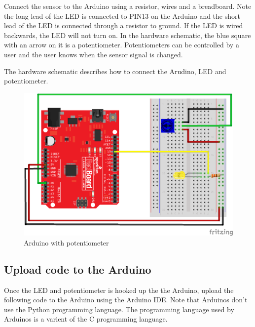 \documentclass{book}
\makeatletter
\def\maxwidth{\ifdim\Gin@nat@width>\linewidth\linewidth
    \else\Gin@nat@width\fi}
\let\Oldincludegraphics\includegraphics
\renewcommand{\includegraphics}[1]{\Oldincludegraphics[width=.8\maxwidth]{#1}}
\makeatother
\begin{document}
    
        Connect the sensor to the Arduino using a resistor, wires and a
breadboard. Note the long lead of the LED is connected to PIN13 on the
Arduino and the short lead of the LED is connected through a resistor to
ground. If the LED is wired backwards, the LED will not turn on. In the
hardware schematic, the blue square with an arrow on it is a
potentiometer. Potentiometers can be controlled by a user and the user
knows when the sensor signal is changed.

The hardware schematic describes how to connect the Arudino, LED and
potentiometer.
    




    
        \begin{figure}
\centering
\includegraphics{images/redboard_pot_led_fritzing.png}
\caption{Arduino with potentiometer}
\end{figure}
    




    
        \subsection{Upload code to the
Arduino}\label{upload-code-to-the-arduino}
    




    
        Once the LED and potentiometer is hooked up the the Arduino, upload the
following code to the Arduino using the Arduino IDE. Note that Arduinos
don't use the Python programming language. The programming language used
by Arduinos is a varient of the C programming language.
\end{document}
